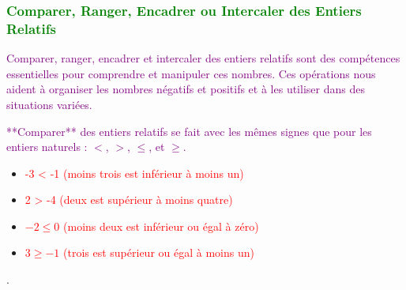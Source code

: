 \documentclass{article}
\begin{document}
\vspace{0.5cm}

\begin{center}
\end{center}

\subsubsection{\textcolor{green}{Comparer, Ranger, Encadrer ou Intercaler des Entiers Relatifs}}

\textcolor{purple}{Comparer, ranger, encadrer et intercaler des entiers relatifs sont des compétences essentielles pour comprendre et manipuler ces nombres. Ces opérations nous aident à organiser les nombres négatifs et positifs et à les utiliser dans des situations variées.}

\vspace{0.35cm}

\textcolor{purple}{**Comparer** des entiers relatifs se fait avec les mêmes signes que pour les entiers naturels : \(<\), \(>\), \(\leq\), et \(\geq\).}

\vspace{0.5cm}

\begin{tcolorbox}[colback=orange!10!white, colframe=orange!75!black, title=\textcolor{white}{Exemples}, sharp corners=southwest]
\begin{itemize}
    \item \textcolor{red}{-3 < -1 (moins trois est inférieur à moins un)}
    \item \textcolor{red}{2 > -4 (deux est supérieur à moins quatre)}
    \item \textcolor{red}{$-2 \leq 0$ (moins deux est inférieur ou égal à zéro)}
    \item \textcolor{red}{$3 \geq -1$ (trois est supérieur ou égal à moins un)}
\end{itemize}.
\end{tcolorbox}
\end{document}
